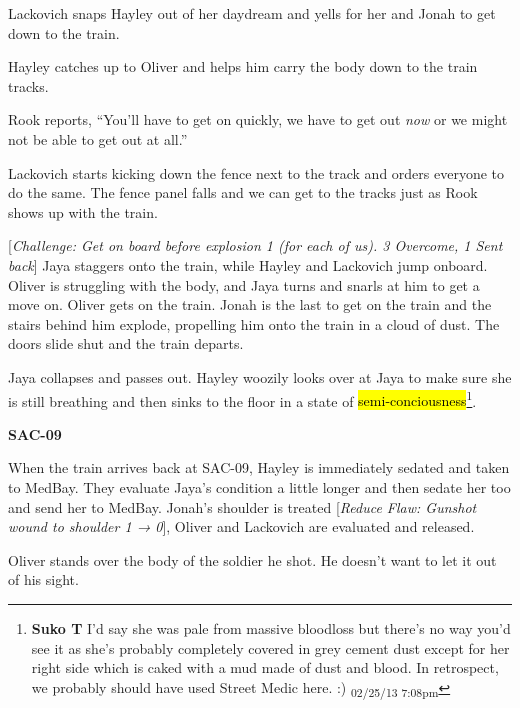 Lackovich snaps Hayley out of her daydream and yells for her and Jonah to get down to the train.



Hayley catches up to Oliver and helps him carry the body down to the train tracks.



Rook reports, ``You'll have to get on quickly, we have to get out \textit{now} or we might not be able to get out at all.''



Lackovich starts kicking down the fence next to the track and orders everyone to do the same.  The fence panel falls and we can get to the tracks just as Rook shows up with the train.



{[}\textit{Challenge: Get on board before explosion 1 (for each of us).  3 Overcome, 1 Sent back}{]}  Jaya staggers onto the train, while Hayley and Lackovich jump onboard.  Oliver is struggling with the body, and Jaya turns and snarls at him to get a move on.  Oliver gets on the train.  Jonah is the last to get on the train and the stairs behind him explode, propelling him onto the train in a cloud of dust.  The doors slide shut and the train departs.



Jaya collapses and passes out. Hayley woozily looks over at Jaya to make sure she is still breathing and then sinks to the floor in a state of \hl{semi-conciousness}\footnote{\textbf{Suko T }I'd say she was pale from massive bloodloss but there's no way you'd see it as she's probably completely covered in grey cement dust except for her right side which is caked with a mud made of dust and blood.  In retrospect, we probably should have used Street Medic here. :) \textsubscript{02/25/13 7:08pm}}.



 {\LARGE \textbf{SAC-09} } 



When the train arrives back at SAC-09, Hayley is immediately sedated and taken to MedBay.  They evaluate Jaya's condition a little longer and then sedate her too and send her to MedBay.  Jonah's shoulder is treated {[}\textit{Reduce Flaw: Gunshot wound to shoulder 1 → 0}{]}, Oliver and Lackovich are evaluated and released.



Oliver stands over the body of the soldier he shot. He doesn't want to let it out of his sight.

